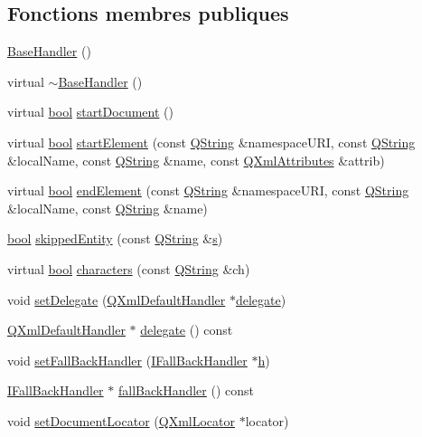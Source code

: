 \subsection*{Fonctions membres publiques}
\begin{DoxyCompactItemize}
\item 
\hyperlink{class_base_handler_a06798f3d53cd86c06eab9a6f6dc1f761}{Base\+Handler} ()
\item 
virtual \hyperlink{class_base_handler_a57a8298145781738b258940e82b948fb}{$\sim$\+Base\+Handler} ()
\item 
virtual \hyperlink{qglobal_8h_a1062901a7428fdd9c7f180f5e01ea056}{bool} \hyperlink{class_base_handler_ad982903d941c15f7a89ff7a269a391df}{start\+Document} ()
\item 
virtual \hyperlink{qglobal_8h_a1062901a7428fdd9c7f180f5e01ea056}{bool} \hyperlink{class_base_handler_a15c20baf7065b3eb92ae7a336ccdf20b}{start\+Element} (const \hyperlink{class_q_string}{Q\+String} \&namespace\+U\+R\+I, const \hyperlink{class_q_string}{Q\+String} \&local\+Name, const \hyperlink{class_q_string}{Q\+String} \&name, const \hyperlink{class_q_xml_attributes}{Q\+Xml\+Attributes} \&attrib)
\item 
virtual \hyperlink{qglobal_8h_a1062901a7428fdd9c7f180f5e01ea056}{bool} \hyperlink{class_base_handler_aa1b987506d2f962ba478b8bab388bff9}{end\+Element} (const \hyperlink{class_q_string}{Q\+String} \&namespace\+U\+R\+I, const \hyperlink{class_q_string}{Q\+String} \&local\+Name, const \hyperlink{class_q_string}{Q\+String} \&name)
\item 
\hyperlink{qglobal_8h_a1062901a7428fdd9c7f180f5e01ea056}{bool} \hyperlink{class_base_handler_a2191a9b5ac9ebddc8c91dd56fff8e684}{skipped\+Entity} (const \hyperlink{class_q_string}{Q\+String} \&\hyperlink{060__command__switch_8tcl_a011c73f2dbb87635a3b4206c72355f6e}{s})
\item 
virtual \hyperlink{qglobal_8h_a1062901a7428fdd9c7f180f5e01ea056}{bool} \hyperlink{class_base_handler_a9b7b29fcc7a0976d8e3be6f8ca1e67fd}{characters} (const \hyperlink{class_q_string}{Q\+String} \&ch)
\item 
void \hyperlink{class_base_handler_ac94e086080a08af141e1db699fd45c12}{set\+Delegate} (\hyperlink{class_q_xml_default_handler}{Q\+Xml\+Default\+Handler} $\ast$\hyperlink{class_base_handler_a2b2eb4af1c3a848dc944dede7e3fb7da}{delegate})
\item 
\hyperlink{class_q_xml_default_handler}{Q\+Xml\+Default\+Handler} $\ast$ \hyperlink{class_base_handler_a2b2eb4af1c3a848dc944dede7e3fb7da}{delegate} () const 
\item 
void \hyperlink{class_base_handler_a2bfce6fd9fd72a5d6ea20c90f8570e9c}{set\+Fall\+Back\+Handler} (\hyperlink{class_i_fall_back_handler}{I\+Fall\+Back\+Handler} $\ast$\hyperlink{060__command__switch_8tcl_af96fd0966e32a310a0778d2e5c357700}{h})
\item 
\hyperlink{class_i_fall_back_handler}{I\+Fall\+Back\+Handler} $\ast$ \hyperlink{class_base_handler_a7caeeea3aecb319ee1d7a00718debd71}{fall\+Back\+Handler} () const 
\item 
void \hyperlink{class_base_handler_abedc453093f90a5436a0bcb0c78b4aca}{set\+Document\+Locator} (\hyperlink{class_q_xml_locator}{Q\+Xml\+Locator} $\ast$locator)
\end{DoxyCompactItemize}
